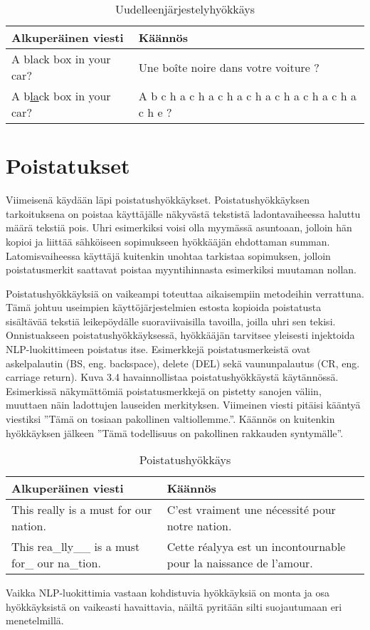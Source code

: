 \begin{table}[hbt]
  \begin{tabular}{| l | m{20em} |}
    \hline
    Alkuperäinen viesti & Käännös\\
    \hline
    A black box in your car? & Une boîte noire dans votre voiture ?\\
    \hline
    A b\underline{la}ck box in your car? & A b c h a c h a c h a c h a c h a c h a c h a c h e ?\\
    \hline
  \end{tabular}
  \caption{Uudelleenjärjestelyhyökkäys \citep{boucher2021bad}}
\end{table}

\section{Poistatukset}

Viimeisenä käydään läpi poistatushyökkäykset. Poistatushyökkäyksen tarkoituksena on poistaa käyttäjälle näkyvästä tekstistä ladontavaiheessa haluttu määrä tekstiä pois. Uhri esimerkiksi voisi olla myymässä asuntoaan, jolloin hän kopioi ja liittää sähköiseen sopimukseen hyökkääjän ehdottaman summan. Latomisvaiheessa käyttäjä kuitenkin unohtaa tarkistaa sopimuksen, jolloin poistatusmerkit saattavat poistaa myyntihinnasta esimerkiksi muutaman nollan.

Poistatushyökkäyksiä on vaikeampi toteuttaa aikaisempiin metodeihin verrattuna. Tämä johtuu useimpien käyttöjärjestelmien estosta kopioida poistatusta sisältävää tekstiä leikepöydälle suoraviivaisilla tavoilla, joilla uhri sen tekisi. Onnistuakseen poistatushyökkäyksessä, hyökkääjän tarvitsee yleisesti injektoida NLP-luokittimeen poistatus itse. Esimerkkejä poistatusmerkeistä ovat askelpalautin (BS, eng. backspace), delete (DEL) sekä vaununpalautus (CR, eng. carriage return). \citep{boucher2021bad}
Kuva 3.4 havainnollistaa poistatushyökkäystä käytännössä. Esimerkissä  näkymättömiä poistatusmerkkejä on pistetty sanojen väliin, muuttaen näin ladottujen lauseiden merkityksen. Viimeinen viesti pitäisi kääntyä viestiksi ''Tämä on tosiaan pakollinen valtiollemme.''. Käännös on kuitenkin hyökkäyksen jälkeen ''Tämä todellisuus on pakollinen rakkauden syntymälle''.

\begin{table}[hbt]
  \begin{tabular}{| l | m{17em} |}
    \hline
    Alkuperäinen viesti & Käännös\\
    \hline
    This really is a must for our nation. & C'est vraiment une nécessité pour notre nation.\\
    \hline
    This rea\_lly\_\_ is a must for\_ our na\_tion. & Cette réalyya est un incontournable pour la naissance de l'amour.\\
    \hline
  \end{tabular}
  \caption{Poistatushyökkäys \citep{boucher2021bad}}
\end{table}

Vaikka NLP-luokittimia vastaan kohdistuvia hyökkäyksiä on monta ja osa hyökkäyksistä on vaikeasti havaittavia, näiltä pyritään silti suojautumaan eri menetelmillä.